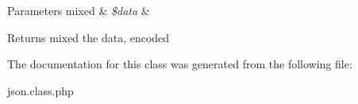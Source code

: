 \begin{DoxyParams}[1]{Parameters}
mixed & {\em \$data} & \\
\hline
\end{DoxyParams}
\begin{DoxyReturn}{Returns}
mixed the data, encoded 
\end{DoxyReturn}


The documentation for this class was generated from the following file\-:\begin{DoxyCompactItemize}
\item 
json.\-class.\-php\end{DoxyCompactItemize}
